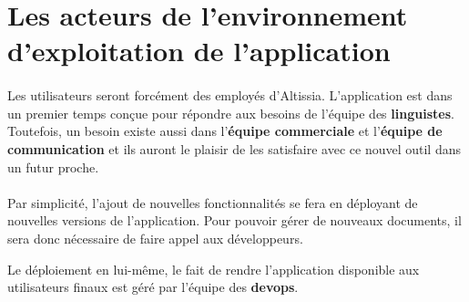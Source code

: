 \section{Les acteurs de l'environnement d'exploitation de l'application}
\label{sec:application-prod-env-actors}

\paragraph{}
Les utilisateurs seront forcément des employés d'Altissia.
L'application est dans un premier temps conçue pour répondre aux besoins de l'équipe des \textbf{linguistes}.
Toutefois, un besoin existe aussi dans l'\textbf{équipe commerciale} et l'\textbf{équipe de communication} et ils auront le plaisir de les satisfaire avec ce nouvel outil dans un futur proche.

\paragraph{}
Par simplicité, l'ajout de nouvelles fonctionnalités se fera en déployant de nouvelles versions de l'application.
Pour pouvoir gérer de nouveaux documents, il sera donc nécessaire de faire appel aux développeurs.

Le déploiement en lui-même, le fait de rendre l'application disponible aux utilisateurs finaux est géré par l'équipe des \textbf{devops}\fnmark.

